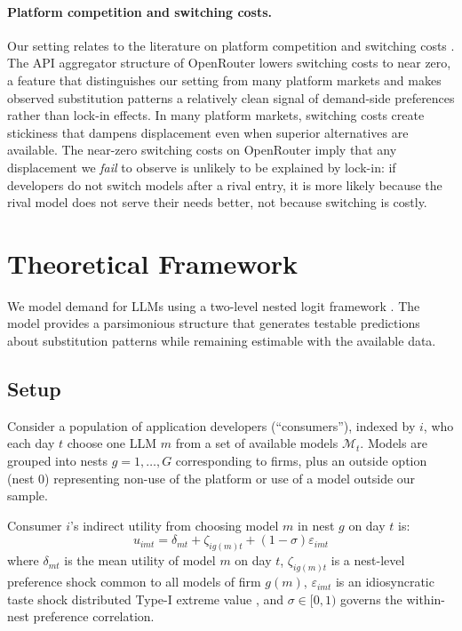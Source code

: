 \documentclass[11pt, a4paper]{article}
\begin{document}
\paragraph{Platform competition and switching costs.} Our setting relates to the literature on platform competition \citep{rietveld2021platform} and switching costs \citep{farrell2007coordination}. The API aggregator structure of OpenRouter lowers switching costs to near zero, a feature that distinguishes our setting from many platform markets and makes observed substitution patterns a relatively clean signal of demand-side preferences rather than lock-in effects. In many platform markets, switching costs create stickiness that dampens displacement even when superior alternatives are available. The near-zero switching costs on OpenRouter imply that any displacement we \emph{fail} to observe is unlikely to be explained by lock-in: if developers do not switch models after a rival entry, it is more likely because the rival model does not serve their needs better, not because switching is costly.

\section{Theoretical Framework}
\label{sec:theory}

We model demand for LLMs using a two-level nested logit framework \citep{berry1994estimating, mcfadden1978modelling}. The model provides a parsimonious structure that generates testable predictions about substitution patterns while remaining estimable with the available data.

\subsection{Setup}

Consider a population of application developers (``consumers''), indexed by $i$, who each day $t$ choose one LLM $m$ from a set of available models $\mathcal{M}_t$. Models are grouped into nests $g = 1, \ldots, G$ corresponding to firms, plus an outside option (nest 0) representing non-use of the platform or use of a model outside our sample.

Consumer $i$'s indirect utility from choosing model $m$ in nest $g$ on day $t$ is:
\begin{equation}
u_{imt} = \delta_{mt} + \zeta_{ig(m)t} + (1 - \sigma)\varepsilon_{imt}
\label{eq:utility}
\end{equation}
where $\delta_{mt}$ is the mean utility of model $m$ on day $t$, $\zeta_{ig(m)t}$ is a nest-level preference shock common to all models of firm $g(m)$, $\varepsilon_{imt}$ is an idiosyncratic taste shock distributed Type-I extreme value \citep{cardell1997variance}, and $\sigma \in [0, 1)$ governs the within-nest preference correlation.
\end{document}
